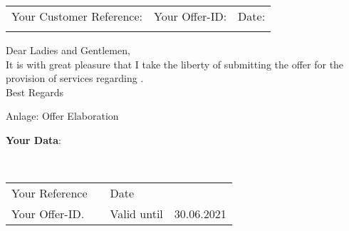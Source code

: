 \begin{minipage}{\textwidth}
	\begin{tabularx}{\textwidth}{X X X}
		Your Customer Reference:			& Your Offer-ID:			& 	Date: 	 		\\
		\large \Customer					& \large \Offer 			&	\large \CreateDate		\\
	\end{tabularx}
\end{minipage}
\vspace*{11pt}

\begin{minipage}{\textwidth}
	\textbf{\Subject}
\end{minipage}
\vspace*{22pt}


\begin{minipage}{\textwidth}
Dear Ladies and Gentlemen, \\ 

It is with great pleasure that I take the liberty of submitting the offer for the provision of services regarding \Subject. \\

Best Regards\\
\vspace*{33pt}

Anlage: Offer Elaboration
\end{minipage}

\newpage

\newcolumntype{b}{X}
\newcommand{\ts}{\vspace{5pt}}

\begin{Large} \textbf{Your Data}: \end{Large} \\ \vspace*{11pt}
\begin{tabularx}{\textwidth}{b s s s}
	Your Reference		& \Customer 		& Date 				& \CreateDate 	\\
	Your Offer-ID.		& \Offer 			& Valid until 		& 30.06.2021	\\
\end{tabularx}
\vspace*{22pt}



